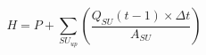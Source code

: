 \begin{equation}
\label{HeightSU}
H = P + \sum_{SU_{up}} \left( \frac{Q_{SU}(t-1) \times \Delta t}{A_{SU}} \right)
\end{equation}
